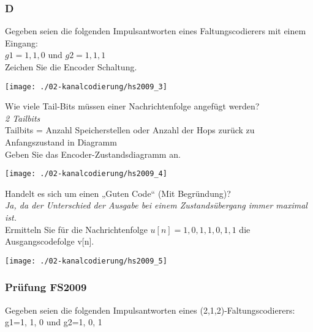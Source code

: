 \columnbreak

\subsubsection{D}
Gegeben seien die folgenden Impulsantworten eines Faltungscodierers mit einem Eingang:\\
${g1}={1,1,0}$ und ${g2}={1,1,1}$\\

Zeichen Sie die Encoder Schaltung.
\begin{center}
    \vspace{-8pt}
    \texttt{[image: ./02-kanalcodierung/hs2009\_3]}
    \vspace{-8pt}
\end{center}

Wie viele Tail-Bits müssen einer Nachrichtenfolge angefügt werden?\\
\textit{2 Tailbits}\\
Tailbits = Anzahl Speicherstellen oder Anzahl der Hops zurück zu Anfangszustand in Diagramm\\

Geben Sie das Encoder-Zustandsdiagramm an.\\
\begin{center}
    \vspace{-8pt}
    \texttt{[image: ./02-kanalcodierung/hs2009\_4]}
    \vspace{-8pt}
\end{center}

Handelt es sich um einen „Guten Code“ (Mit Begründung)?\\
\textit{Ja, da der Unterschied der Ausgabe bei einem Zustandsübergang immer maximal ist.}\\

Ermitteln Sie für die Nachrichtenfolge ${u[n]}={1,0,1,1,0,1,1}$ die Ausgangscodefolge {v[n]}.\\
\begin{center}
    \vspace{-8pt}
    \texttt{[image: ./02-kanalcodierung/hs2009\_5]}
    \vspace{-8pt}
\end{center}

\subsubsection{Prüfung FS2009}
Gegeben seien die folgenden Impulsantworten eines (2,1,2)-Faltungscodierers: {g1}={1, 1, 0} und {g2}={1, 0, 1}\\

